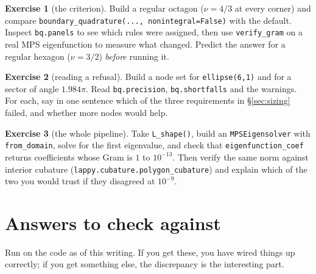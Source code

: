 \documentclass[11pt]{article}
\theoremstyle{definition}
\newtheorem{exercise}{Exercise}
\theoremstyle{remark}
\newcommand{\code}[1]{\texttt{#1}}
\begin{document}
\begin{exercise}[the criterion]
Build a regular octagon ($\nu=4/3$ at every corner) and compare
\code{boundary\_quadrature(..., nonintegral=False)} with the default. Inspect
\code{bq.panels} to see which rules were assigned, then use \code{verify\_gram}
on a real MPS eigenfunction to measure what changed. Predict the answer for a
regular hexagon ($\nu=3/2$) \emph{before} running it.
\end{exercise}

\begin{exercise}[reading a refusal]
Build a node set for \code{ellipse(6,1)} and for a sector of angle $1.984\pi$.
Read \code{bq.precision}, \code{bq.shortfalls} and the warnings. For each, say in
one sentence which of the three requirements in \S\ref{sec:sizing} failed, and
whether more nodes would help.
\end{exercise}

\begin{exercise}[the whole pipeline]
Take \code{L\_shape()}, build an \code{MPSEigensolver} with
\code{from\_domain}, solve for the first eigenvalue, and check that
\code{eigenfunction\_coef} returns coefficients whose Gram is $1$ to
$10^{-13}$. Then verify the same norm against interior cubature
(\code{lappy.cubature.polygon\_cubature}) and explain which of the two you would
trust if they disagreed at $10^{-9}$.
\end{exercise}

\section{Answers to check against}

Run on the code as of this writing. If you get these, you have wired things up
correctly; if you get something else, the discrepancy is the interesting part.
\end{document}
